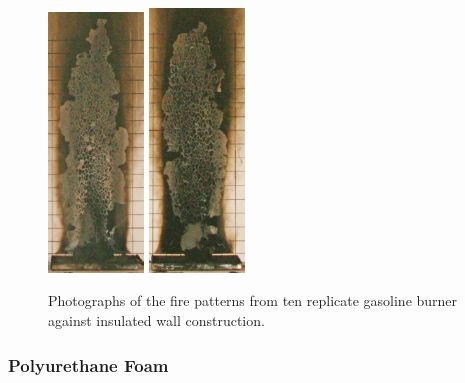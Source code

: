 \documentclass[twoside]{uocthesis}
\begin{document}
{\begin{figure}[p]
	\includegraphics[width=1.0in]{../Figures/GBGAS_21_IMG_6006}
	\includegraphics[width=1.0in]{../Figures/GBGAS_22_IMG_6026}	\\

	\caption[Photographs of the fire patterns from ten replicate gasoline burner against insulated wall construction]{Photographs of the fire patterns from ten replicate gasoline burner against insulated wall construction.}
	\label{Gas_Insulated_Wall}
\end{figure}

\subsubsection{Polyurethane Foam}

}
\end{document}
